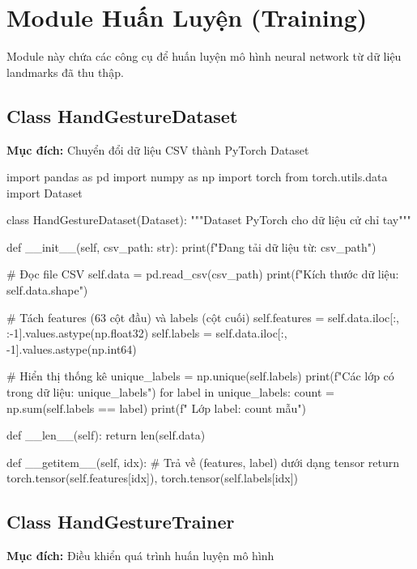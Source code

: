 
\section{Module Huấn Luyện (Training)}

Module này chứa các công cụ để huấn luyện mô hình neural network từ dữ liệu landmarks đã thu thập.

\subsection{Class HandGestureDataset}
\textbf{Mục đích:} Chuyển đổi dữ liệu CSV thành PyTorch Dataset

\begin{aivncodebox}
\begin{python}
import pandas as pd
import numpy as np
import torch
from torch.utils.data import Dataset

class HandGestureDataset(Dataset):
    """Dataset PyTorch cho dữ liệu cử chỉ tay"""
    
    def __init__(self, csv_path: str):
        print(f"Đang tải dữ liệu từ: {csv_path}")
        
        # Đọc file CSV
        self.data = pd.read_csv(csv_path)
        print(f"Kích thước dữ liệu: {self.data.shape}")
        
        # Tách features (63 cột đầu) và labels (cột cuối)
        self.features = self.data.iloc[:, :-1].values.astype(np.float32)
        self.labels = self.data.iloc[:, -1].values.astype(np.int64)
        
        # Hiển thị thống kê
        unique_labels = np.unique(self.labels)
        print(f"Các lớp có trong dữ liệu: {unique_labels}")
        for label in unique_labels:
            count = np.sum(self.labels == label)
            print(f"  Lớp {label}: {count} mẫu")
    
    def __len__(self):
        return len(self.data)
    
    def __getitem__(self, idx):
        # Trả về (features, label) dưới dạng tensor
        return torch.tensor(self.features[idx]), torch.tensor(self.labels[idx])
\end{python}
\end{aivncodebox}

\subsection{Class HandGestureTrainer}
\textbf{Mục đích:} Điều khiển quá trình huấn luyện mô hình

